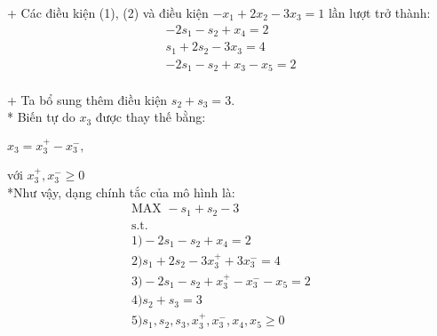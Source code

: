 + Các điều kiện (1), (2) và điều kiện
 $-x_1 + 2x_2 - 3x_3 = 1$ lần lượt trở thành:\\
\begin{align*}
    -2s_1 - s_2 + x_4 = 2 \\
    s_1 + 2s_2 - 3x_3 = 4 \\
    -2s_1 - s_2 + x_3 -x_5 = 2 
\end{align*}
\\
+ Ta bổ sung thêm điều kiện $s_2 + s_3 = 3$.
\\
* Biến tự do $x_3$ được thay thế bằng:
\begin{center}
    $x_3 = x_{3}^{+} - x_{3}^{-},$
\end{center}
với $x_{3}^{+}, x_{3}^{-} \geq 0$
\\
*Như vậy, dạng chính tắc của mô hình là:
\begin{align*}
    \text{MAX  } -s_1 + s_2 - 3 &&
    \\
    \text{s.t.} &&
    \\
    1) -2s_1 - s_2 + x_4 = 2 &&
    \\
    2) s_1 + 2s_2 - 3x_{3}^{+} + 3x_{3}^{-} = 4 &&
    \\
    3) -2s_1 - s_2 + x_{3}^{+} - x_{3}^{-} - x_5 = 2 &&
    \\
    4) s_2 + s_3 = 3 &&
    \\
    5) s_1, s_2, s_3, x_{3}^{+}, x_{3}^{-}, x_4, x_5 \geq 0
    \\
\end{align*}
